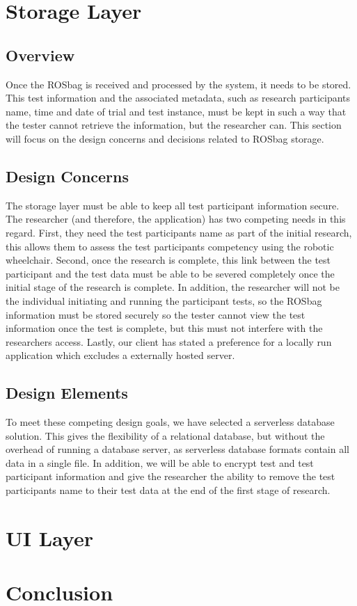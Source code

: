 \documentclass[onecolumn, draftclsnofoot,10pt, compsoc]{IEEEtran}
\begin{document}
\section{Storage Layer}
\subsection{Overview}
Once the ROSbag is received and processed by the system, it needs to be stored. This test information and the associated metadata, such as research participants name, time and date of trial and test instance, must be kept in such a way that the tester cannot retrieve the information, but the researcher can. This section will focus on the design concerns and decisions related to ROSbag storage. 
\subsection{Design Concerns}
The storage layer must be able to keep all test participant information secure. The researcher (and therefore, the application) has two competing needs in this regard. First, they need the test participants name as part of the initial research, this allows them to assess the test participants competency using the robotic wheelchair. Second, once the research is complete, this link between the test participant and the test data must be able to be severed completely once the initial stage of the research is complete. In addition, the researcher will not be the individual initiating and running the participant tests, so the ROSbag information must be stored securely so the tester cannot view the test information once the test is complete, but this must not interfere with the researchers access. Lastly, our client has stated a preference for a locally run application which excludes a externally hosted server.
\subsection{Design Elements}
To meet these competing design goals, we have selected a serverless database solution. This gives the flexibility of a relational database, but without the overhead of running a database server, as serverless database formats contain all data in a single file. In addition, we will be able to encrypt test and test participant information and give the researcher the ability to remove the test participants name to their test data at the end of the first stage of research. 

\section{UI Layer}
  
\section{Conclusion}


\end{document}
